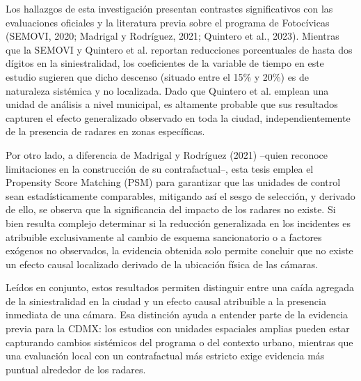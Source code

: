 Los hallazgos de esta investigación presentan contrastes significativos con las evaluaciones oficiales y la literatura previa sobre el programa de Fotocívicas (SEMOVI, 2020; Madrigal y Rodríguez, 2021; Quintero et al., 2023). Mientras que la SEMOVI y Quintero et al. reportan reducciones porcentuales de hasta dos dígitos en la siniestralidad, los coeficientes de la variable de tiempo en este estudio sugieren que dicho descenso (situado entre el 15\% y 20\%) es de naturaleza sistémica y no localizada. Dado que Quintero et al. emplean una unidad de análisis a nivel municipal, es altamente probable que sus resultados capturen el efecto generalizado observado en toda la ciudad, independientemente de la presencia de radares en zonas específicas.

Por otro lado, a diferencia de Madrigal y Rodríguez (2021) --quien reconoce limitaciones en la construcción de su contrafactual--, esta tesis emplea el Propensity Score Matching (PSM) para garantizar que las unidades de control sean estadísticamente comparables, mitigando así el sesgo de selección, y derivado de ello, se observa que la significancia del impacto de los radares no existe. Si bien resulta complejo determinar si la reducción generalizada en los incidentes es atribuible exclusivamente al cambio de esquema sancionatorio o a factores exógenos no observados, la evidencia obtenida solo permite concluir que no existe un efecto causal localizado derivado de la ubicación física de las cámaras.

Leídos en conjunto, estos resultados permiten distinguir entre una caída agregada de la siniestralidad en la ciudad y un efecto causal atribuible a la presencia inmediata de una cámara. Esa distinción ayuda a entender parte de la evidencia previa para la CDMX: los estudios con unidades espaciales amplias pueden estar capturando cambios sistémicos del programa o del contexto urbano, mientras que una evaluación local con un contrafactual más estricto exige evidencia más puntual alrededor de los radares.
